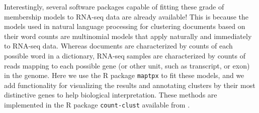 Interestingly, several software packages capable of fitting these grade of membership models to RNA-seq data are already available! This is because
the models used in natural language processing for clustering documents based on their word counts are multinomial models that
apply naturally and immediately to RNA-seq data. Whereas documents are characterized by counts of each possible word in a dictionary, RNA-seq samples
are characterized by counts of reads mapping to each possible gene (or other unit, such as transcript, or exon) in the genome. 
Here we use the R package {\tt maptpx} \cite{Taddy2012} to fit these models, and we add functionality for visualizing the results and annotating
clusters by their most distinctive genes to help biological interpretation. These methods are implemented in the R package {\tt count-clust} available
from \url{}.  










